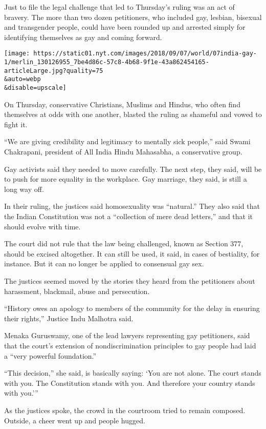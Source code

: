 Just to file the legal challenge that led to Thursday's ruling was an
act of bravery. The more than two dozen petitioners, who included gay,
lesbian, bisexual and transgender people, could have been rounded up and
arrested simply for identifying themselves as gay and coming forward.

\texttt{[image: https://static01.nyt.com/images/2018/09/07/world/07india-gay-1/merlin\_130126955\_7be4d86c-57c8-4b68-9f1e-43a862454165-articleLarge.jpg?quality=75\\\&auto=webp\\\&disable=upscale]}

On Thursday, conservative Christians, Muslims and Hindus, who often find
themselves at odds with one another, blasted the ruling as shameful and
vowed to fight it.

``We are giving credibility and legitimacy to mentally sick people,''
said Swami Chakrapani, president of All India Hindu Mahasabha, a
conservative group.

Gay activists said they needed to move carefully. The next step, they
said, will be to push for more equality in the workplace. Gay marriage,
they said, is still a long way off.

In their ruling, the justices said homosexuality was ``natural.'' They
also said that the Indian Constitution was not a ``collection of mere
dead letters,'' and that it should evolve with time.

The court did not rule that the law being challenged, known as Section
377, should be excised altogether. It can still be used, it said, in
cases of bestiality, for instance. But it can no longer be applied to
consensual gay sex.

The justices seemed moved by the stories they heard from the petitioners
about harassment, blackmail, abuse and persecution.

``History owes an apology to members of the community for the delay in
ensuring their rights,'' Justice Indu Malhotra said.

Menaka Guruswamy, one of the lead lawyers representing gay petitioners,
said that the court's extension of nondiscrimination principles to gay
people had laid a ``very powerful foundation.''

``This decision,'' she said, is basically saying: `You are not alone.
The court stands with you. The Constitution stands with you. And
therefore your country stands with you.'''

As the justices spoke, the crowd in the courtroom tried to remain
composed. Outside, a cheer went up and people hugged.


